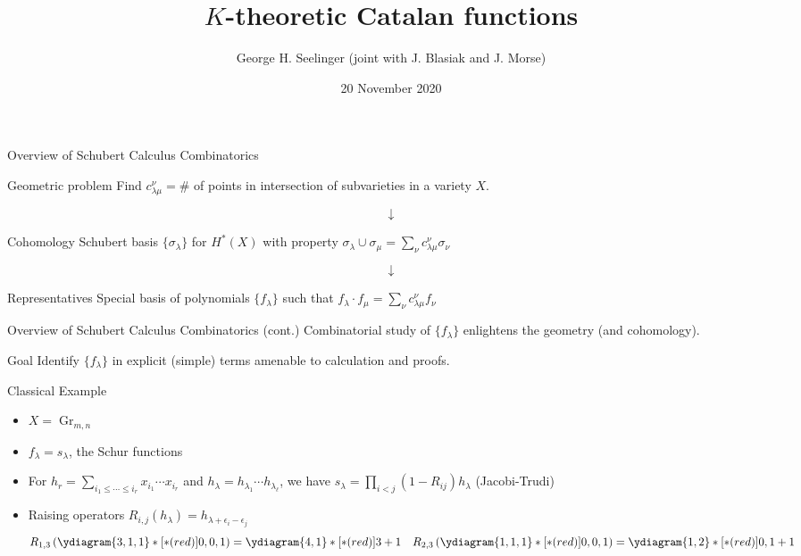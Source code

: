 \documentclass{beamer}
\title[\(K\)-theoretic Catalan functions]{\(K\)-theoretic Catalan functions} %
\author[George H. Seelinger]{George H. Seelinger (joint with
  J. Blasiak and J. Morse)} %
\institute[UVA] %
{
JMRA\\ %
\medskip
\textit{ghs9ae@virginia.edu} %
}
\date{20 November 2020} %
\DeclareMathOperator{\Gr}{Gr}
\newcommand{\cupprod}{\cup}
\begin{document}
\begin{frame}
\titlepage %
\end{frame}
\begin{frame}{Overview of Schubert Calculus Combinatorics}
  \begin{block}{Geometric problem}
    Find \(c_{\lambda \mu}^\nu = \#\) of points in
    intersection of subvarieties in a variety \(X\). \pause
  \end{block}
  \[
    \downarrow
  \]
  \begin{block}{Cohomology}
    Schubert basis \(\{\sigma_\lambda\}\) for \(H^*(X)\) with property \(\sigma_\lambda \cupprod \sigma_\mu = \sum_\nu c_{\lambda \mu}^\nu \sigma_\nu\) \pause 
\end{block}
\[
  \downarrow
\]
\begin{block}{Representatives}
  Special basis of polynomials \(\{f_\lambda\}\) such that \(f_\lambda \cdot f_\mu = \sum_\nu c_{\lambda \mu}^\nu f_\nu\)
\end{block}
\end{frame}
\begin{frame}{Overview of Schubert Calculus Combinatorics (cont.)}
  Combinatorial study of \(\{f_\lambda\}\) enlightens the geometry
  (and cohomology). \pause
  \begin{alertblock}{Goal}
    Identify \(\{f_\lambda\}\) in explicit (simple) terms amenable to
    calculation and proofs.
  \end{alertblock}
\end{frame}
\begin{frame}{Classical Example}
  \begin{example}
    \begin{itemize}
    \item \(X = \Gr_{m,n}\) \pause
    \item \(f_\lambda = s_\lambda\), the Schur functions \pause
    \item For \(h_r = \sum_{i_1 \leq \cdots \leq i_r} x_{i_1}
      \cdots x_{i_r}\) and \(h_\lambda = h_{\lambda_1} \cdots
      h_{\lambda_\ell}\), we have \(s_\lambda = \prod_{i < j} (1-R_{ij})h_\lambda\)
      (Jacobi-Trudi) \pause
      \item Raising operators
    \(R_{i,j}(h_\lambda) = h_{\lambda+\epsilon_i-\epsilon_j}\)
    \[
      R_{1,3} \left( \ydiagram{3,1,1}*[*(red)]{0,0,1} \right) =
      \ydiagram{4,1}*[*(red)]{3+1} \ \ \ R_{2,3} \left(
        \ydiagram{1,1,1}*[*(red)]{0,0,1} \right) =
      \ydiagram{1,2}*[*(red)]{0,1+1}
    \] 
    \end{itemize}
  \end{example}
\end{frame}
\end{document}
